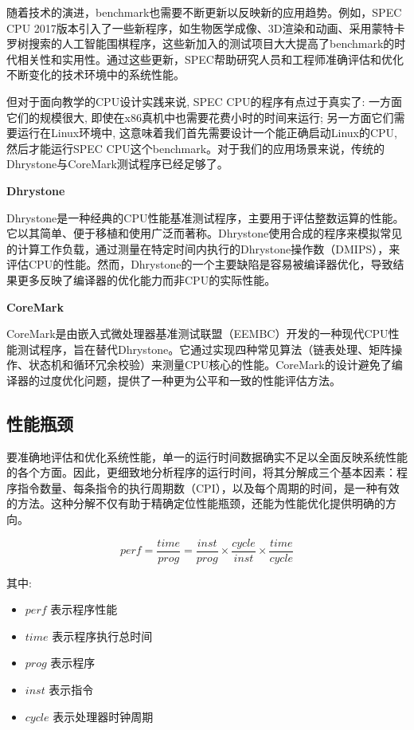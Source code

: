 随着技术的演进，benchmark也需要不断更新以反映新的应用趋势。例如，SPEC CPU 2017版本引入了一些新程序，如生物医学成像、3D渲染和动画、采用蒙特卡罗树搜索的人工智能围棋程序，这些新加入的测试项目大大提高了benchmark的时代相关性和实用性。通过这些更新，SPEC帮助研究人员和工程师准确评估和优化不断变化的技术环境中的系统性能。

但对于面向教学的CPU设计实践来说, SPEC CPU的程序有点过于真实了: 一方面它们的规模很大, 即使在x86真机中也需要花费小时的时间来运行; 另一方面它们需要运行在Linux环境中, 这意味着我们首先需要设计一个能正确启动Linux的CPU, 然后才能运行SPEC CPU这个benchmark。对于我们的应用场景来说，传统的Dhrystone与CoreMark测试程序已经足够了。

\textbf{Dhrystone}

Dhrystone是一种经典的CPU性能基准测试程序，主要用于评估整数运算的性能。它以其简单、便于移植和使用广泛而著称。Dhrystone使用合成的程序来模拟常见的计算工作负载，通过测量在特定时间内执行的Dhrystone操作数（DMIPS），来评估CPU的性能。然而，Dhrystone的一个主要缺陷是容易被编译器优化，导致结果更多反映了编译器的优化能力而非CPU的实际性能。

\textbf{CoreMark}

CoreMark是由嵌入式微处理器基准测试联盟（EEMBC）开发的一种现代CPU性能测试程序，旨在替代Dhrystone。它通过实现四种常见算法（链表处理、矩阵操作、状态机和循环冗余校验）来测量CPU核心的性能。CoreMark的设计避免了编译器的过度优化问题，提供了一种更为公平和一致的性能评估方法。

\subsection{性能瓶颈}\label{sec:09-cache-025}

要准确地评估和优化系统性能，单一的运行时间数据确实不足以全面反映系统性能的各个方面。因此，更细致地分析程序的运行时间，将其分解成三个基本因素：程序指令数量、每条指令的执行周期数（CPI），以及每个周期的时间，是一种有效的方法。这种分解不仅有助于精确定位性能瓶颈，还能为性能优化提供明确的方向。

\[
perf = \frac{time}{prog} = \frac{inst}{prog} \times \frac{cycle}{inst} \times \frac{time}{cycle}
\]

其中:

\begin{itemize}
\tightlist
\item
  \(perf\) 表示程序性能
\item
  \(time\) 表示程序执行总时间
\item
  \(prog\) 表示程序\\
\item
  \(inst\) 表示指令
\item
  \(cycle\) 表示处理器时钟周期
\end{itemize}

